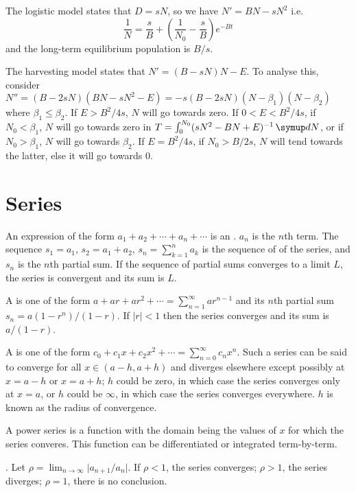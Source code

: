 \documentclass{slnotes}
\begin{document}
The logistic model states that \(D = sN\), so we have \(N' = BN - sN^2\) i.e. \[\frac{1}{N} = \frac{s}{B} + (\frac{1}{N_0} - \frac{s}{B})e^{-Bt}\] and the long-term equilibrium population is \(B/s\).

The harvesting model states that \(N' = (B - sN)N - E\). To analyse this, consider \(N'' = (B-2sN)(BN-sN^2-E) = -s(B-2sN)(N-\beta_1)(N-\beta_2)\) where \(\beta_1 \le \beta_2\). If \(E > B^2/4s\), \(N\) will go towards zero. If \(0 < E < B^2/4s\), if \(N_0 < \beta_1\), \(N\) will go towards zero in \(T = \int^{N_0}_0 (sN^2-BN+E)^{-1}\,\sld N\), or if \(N_0 > \beta_1\), \(N\) will go towards \(\beta_2\). If \(E = B^2/4s\), if \(N_0 > B/2s\), \(N\) will tend towards the latter, else it will go towards 0.

\chapter{Series}
An expression of the form \(a_1 + a_2 + \cdots + a_n + \cdots\) is an . \(a_n\) is the \(n\)th term. The sequence \(s_1 = a_1\), \(s_2 = a_1 + a_2\), \(s_n = \sum^n_{k=1}a_k\) is the sequence of  of the series, and \(s_n\) is the \(n\)th partial sum. If the sequence of partial sums converges to a limit \(L\), the series is convergent and its sum is \(L\).

A  is one of the form \(a + ar + ar^2 + \cdots = \sum^\infty_{n=1}ar^{n-1}\) and its \(n\)th partial sum \(s_n = a(1-r^n)/(1-r)\). If \(\lvert r \rvert < 1\) then the series converges and its sum is \(a/(1-r)\).

A  is one of the form \(c_0 + c_1x + c_2x^2 + \cdots = \sum^\infty_{n=0}c_nx^n\). Such a series can be said to converge for all \(x \in (a - h, a + h)\) and diverges elsewhere except possibly at \(x = a - h\) or \(x = a + h\); \(h\) could be zero, in which case the series converges only at \(x = a\), or \(h\) could be \(\infty\), in which case the series converges everywhere. \(h\) is known as the radius of convergence.

A power series is a function with the domain being the values of \(x\) for which the series converes. This function can be differentiated or integrated term-by-term.

. Let \(\rho = \lim_{n\to\infty}\lvert a_{n+1}/a_n \rvert\). If \(\rho < 1\), the series converges; \(\rho > 1\), the series diverges; \(\rho = 1\), there is no conclusion.
\end{document}

